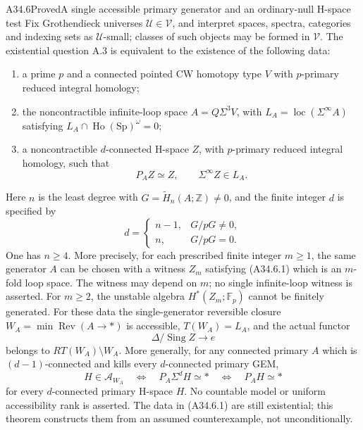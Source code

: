 \begin{claim}{A34.6}{Proved}{A single accessible primary generator and an ordinary-null H-space test}\label{A346}
Fix Grothendieck universes $\mathcal U\in\mathcal V$, and interpret
spaces, spectra, categories and indexing sets as $\mathcal U$-small;
classes of such objects may be formed in $\mathcal V$.
The existential question A.3 is equivalent to the existence of the
following data:
\begin{enumerate}
\item a prime $p$ and a connected pointed CW homotopy type $V$ with
$p$-primary reduced integral homology;
\item the noncontractible infinite-loop space
$A=Q\Sigma^3V$, with
$L_A=\operatorname{loc}(\Sigma^\infty A)$ satisfying
$L_A\cap\operatorname{Ho}(\mathrm{Sp})^\omega=0$;
\item a noncontractible $d$-connected H-space $Z$, with
$p$-primary reduced integral homology, such that
\[
       P_AZ\simeq Z,
       \qquad \Sigma^\infty Z\in L_A.
       \tag{A34.6.1}
\]
\end{enumerate}
Here $n$ is the least degree with
$G=\widetilde H_n(A;\mathbb Z)\ne0$, and the finite integer $d$ is
specified by
\[
 d=\begin{cases}
       n-1,&G/pG\ne0,\\
       n,&G/pG=0.
    \end{cases}
 \tag{A34.6.2}
\]
One has $n\geq4$.  More precisely, for each prescribed finite
integer $m\geq1$, the same generator $A$ can be chosen with a
witness $Z_m$ satisfying \textup{(A34.6.1)} which is an
$m$-fold loop space.  The witness may depend on $m$; no single
infinite-loop witness is asserted.  For $m\geq2$, the unstable
algebra $H^*(Z_m;\mathbb F_p)$ cannot be finitely generated.
For these data the single-generator reversible
closure $W_A=\min\operatorname{Rev}(A\to *)$ is accessible,
$T(W_A)=L_A$, and the actual functor
\[
              \Delta/\operatorname{Sing}Z\longrightarrow e
              \tag{A34.6.3}
\]
belongs to $RT(W_A)\setminus W_A$.
More generally, for any connected primary $A$ which is
$(d-1)$-connected and kills every $d$-connected primary GEM,
\[
 H\in\mathcal A_{W_A}
 \quad\Longleftrightarrow\quad
 P_A\Sigma^dH\simeq *
 \quad\Longleftrightarrow\quad P_AH\simeq *
 \tag{A34.6.4}
\]
for every $d$-connected primary H-space $H$.
No countable model or uniform accessibility rank is asserted.
The data in \textup{(A34.6.1)} are still existential; this theorem
constructs them from an assumed counterexample, not unconditionally.
\end{claim}
